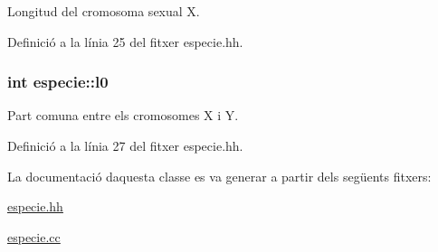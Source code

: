 Longitud del cromosoma sexual X. 



Definició a la línia 25 del fitxer especie.\+hh.

\subsubsection[{\texorpdfstring{l0}{l0}}]{\setlength{\rightskip}{0pt plus 5cm}int especie\+::l0\hspace{0.3cm}{\ttfamily [private]}}\hypertarget{classespecie_a7e4448f0f61a573753aa7000ad073982}{}\label{classespecie_a7e4448f0f61a573753aa7000ad073982}


Part comuna entre els cromosomes X i Y. 



Definició a la línia 27 del fitxer especie.\+hh.



La documentació d\textquotesingle{}aquesta classe es va generar a partir dels següents fitxers\+:\begin{DoxyCompactItemize}
\item 
\hyperlink{especie_8hh}{especie.\+hh}\item 
\hyperlink{especie_8cc}{especie.\+cc}\end{DoxyCompactItemize}
